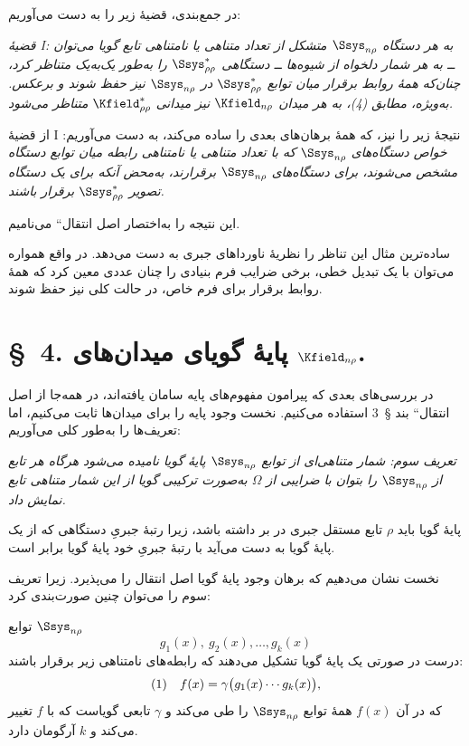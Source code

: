 \documentclass[11pt]{article}
\providecommand{\glqq}{\textquotedblbase}
\providecommand{\grqq}{\textquotedblleft}
\begin{document}
در جمع‌بندی، قضیهٔ زیر را به دست می‌آوریم:

\emph{قضیهٔ I: به هر دستگاه $\Ssys_{n\rho}$ متشکل از تعداد متناهی یا نامتناهی تابع گویا می‌توان ــ به هر شمار دلخواه از شیوه‌ها ــ دستگاهی $\Ssys^*_{\rho\rho}$ را به‌طور یک‌به‌یک متناظر کرد، چنان‌که همهٔ روابط برقرار میان توابع $\Ssys^*_{\rho\rho}$ در $\Ssys_{n\rho}$ نیز حفظ شوند و برعکس. به‌ویژه، مطابق (4)، به هر میدان $\Kfield_{n\rho}$ نیز میدانی $\Kfield^*_{\rho\rho}$ متناظر می‌شود.}

از قضیهٔ I نتیجهٔ زیر را نیز، که همهٔ برهان‌های بعدی را ساده می‌کند، به دست می‌آوریم: \emph{خواص دستگاه‌های $\Ssys_{n\rho}$ که با تعداد متناهی یا نامتناهی رابطه میان توابع دستگاه مشخص می‌شوند، برای دستگاه‌های $\Ssys_{n\rho}$ برقرارند، به‌محض آنکه برای یک دستگاه تصویر $\Ssys^*_{\rho\rho}$ برقرار باشند.}

این نتیجه را به‌اختصار \glqq{}اصل انتقال\grqq{} می‌نامیم.

ساده‌ترین مثال این تناظر را نظریهٔ ناورداهای جبری به دست می‌دهد. در واقع همواره می‌توان با یک تبدیل خطی، برخی ضرایب فرم بنیادی را چنان عددی معین کرد که همهٔ روابط برقرار برای فرم خاص، در حالت کلی نیز حفظ شوند.

\section*{\S\ 4. پایهٔ گویای میدان‌های $\Kfield_{n\rho}$.}

در بررسی‌های بعدی که پیرامون مفهوم‌های پایه سامان یافته‌اند، در همه‌جا از \glqq{}اصل انتقال\grqq{} بند \S\ 3 استفاده می‌کنیم. نخست وجود پایه را برای میدان‌ها ثابت می‌کنیم، اما تعریف‌ها را به‌طور کلی می‌آوریم:

\emph{تعریف سوم: شمار متناهی‌ای از توابع $\Ssys_{n\rho}$ پایهٔ گویا نامیده می‌شود هرگاه هر تابع از $\Ssys_{n\rho}$ را بتوان با ضرایبی از $\Omega$ به‌صورت ترکیبی گویا از این شمار متناهی تابع نمایش داد.}

پایهٔ گویا باید $\rho$ تابع مستقل جبری در بر داشته باشد، زیرا رتبهٔ جبریِ دستگاهی که از یک پایهٔ گویا به دست می‌آید با رتبهٔ جبریِ خود پایهٔ گویا برابر است.

نخست نشان می‌دهیم که برهان وجود پایهٔ گویا اصل انتقال را می‌پذیرد. زیرا تعریف سوم را می‌توان چنین صورت‌بندی کرد:

توابع $\Ssys_{n\rho}$
\[
g_1(x),\ g_2(x),\ldots,g_k(x)
\]
درست در صورتی یک پایهٔ گویا تشکیل می‌دهند که رابطه‌های نامتناهی زیر برقرار باشند:
\[
\begin{array}{@{}l@{\quad}c@{}}
(1)& f(x)=\gamma\bigl(g_1(x)\cdots g_k(x)\bigr),
\end{array}
\]
که در آن $f(x)$ همهٔ توابع $\Ssys_{n\rho}$ را طی می‌کند و $\gamma$ تابعی گویاست که با $f$ تغییر می‌کند و $k$ آرگومان دارد.
\end{document}
